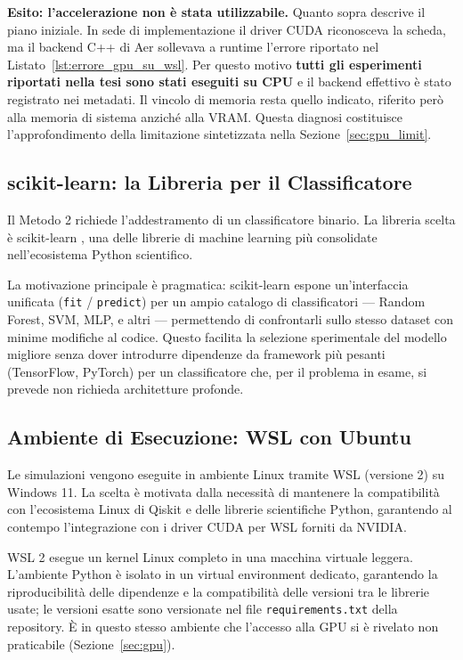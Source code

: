 \begin{onehalfspace}
\textbf{Esito: l'accelerazione non è stata utilizzabile.} Quanto sopra descrive il
piano iniziale. In sede di implementazione il driver CUDA riconosceva la scheda, ma il
backend C++ di Aer sollevava a runtime l'errore riportato nel
Listato~\ref{lst:errore_gpu_su_wsl}. Per questo motivo \textbf{tutti gli esperimenti
riportati nella tesi sono stati eseguiti su \ac{CPU}} e il backend effettivo è stato
registrato nei metadati. Il vincolo di memoria resta quello indicato, riferito però alla
memoria di sistema anziché alla VRAM. Questa diagnosi costituisce l'approfondimento della
limitazione sintetizzata nella Sezione~\ref{sec:gpu_limit}.

\subsection{scikit-learn: la Libreria per il Classificatore}
\label{sec:scikit}

Il Metodo 2 richiede l'addestramento di un classificatore binario. La libreria scelta è scikit-learn \cite{scikit_learn}, una delle librerie di machine learning più consolidate nell'ecosistema Python scientifico.

La motivazione principale è pragmatica: scikit-learn espone un'interfaccia unificata (\texttt{fit} / \texttt{predict}) per un ampio catalogo di classificatori — Random Forest, \ac{SVM}, \ac{MLP}, e altri — permettendo di confrontarli sullo stesso dataset con minime modifiche al codice. Questo facilita la selezione sperimentale del modello migliore senza dover introdurre dipendenze da framework più pesanti (TensorFlow, PyTorch) per un classificatore che, per il problema in esame, si prevede non richieda architetture profonde.

\subsection{Ambiente di Esecuzione: WSL con Ubuntu}
\label{sec:wsl}

Le simulazioni vengono eseguite in ambiente Linux tramite \ac{WSL} (versione 2) su Windows 11. La scelta è motivata dalla necessità di mantenere la compatibilità con l'ecosistema Linux di Qiskit e delle librerie scientifiche Python, garantendo al contempo l'integrazione con i driver CUDA per \ac{WSL} forniti da NVIDIA.

\ac{WSL} 2 esegue un kernel Linux completo in una macchina virtuale leggera. L'ambiente Python è isolato in un virtual environment dedicato, garantendo la riproducibilità delle dipendenze e la compatibilità delle versioni tra le librerie usate; le versioni esatte sono versionate nel file \texttt{requirements.txt} della repository. È in questo stesso ambiente che l'accesso alla \ac{GPU} si è rivelato non praticabile (Sezione~\ref{sec:gpu}).


\end{onehalfspace}
